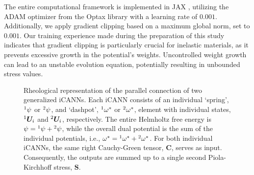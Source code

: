 The entire computational framework is implemented in JAX \cite{jax2018github}, utilizing the ADAM optimizer \cite{kingma2017adammethodstochasticoptimization} from the Optax library with a learning rate of $0.001$. 
Additionally, we apply gradient clipping based on a maximum global norm, set to $0.001$.
Our training experience made during the preparation of this study indicates that gradient clipping is particularly crucial for inelastic materials, as it prevents excessive growth in the potential’s weights. 
Uncontrolled weight growth can lead to an unstable evolution equation, potentially resulting in unbounded stress values.
%
\begin{figure}[h]
    \centering
    
    \caption{Rheological representation of the parallel connection of two generalized iCANNs. Each iCANN consists of an individual `spring', $\prescript{1}{}{}\psi$ or $\prescript{2}{}{}\psi$, and `dashpot', $\prescript{1}{}{}\omega^*$ or $\prescript{2}{}{}\omega^*$, element with individual states, $\prescript{1}{}{}\bm{U}_i$ and $\prescript{2}{}{}\bm{U}_i$, respectively. The entire Helmholtz free energy is $\psi = \prescript{1}{}{}\psi + \prescript{2}{}{}\psi$, while the overall dual potential is the sum of the individual potentials, i.e., $\omega^*=\prescript{1}{}{}\omega^* + \prescript{2}{}{}\omega^*$. For both individual iCANNs, the same right Cauchy-Green tensor, $\bm{C}$, serves as input. Consequently, the outputs are summed up to a single second Piola-Kirchhoff stress, $\bm{S}$.}
    \label{fig:rheo}
\end{figure}
%
